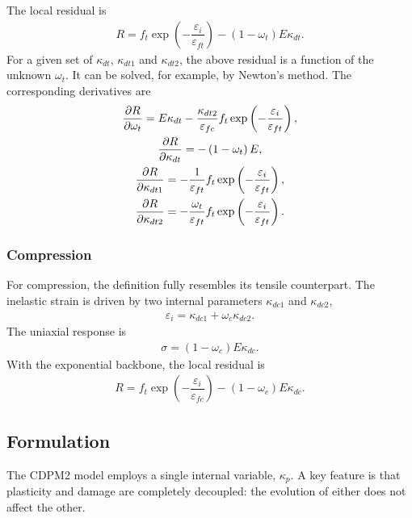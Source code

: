 The local residual is
\begin{gather}\label{eq:cdpm2_dt_r}
R=f_t\exp\left(-\dfrac{\varepsilon_i}{\varepsilon_{ft}}\right)-\left(1-\omega_t\right)E\kappa_{dt}.
\end{gather}
For a given set of $\kappa_{dt}$, $\kappa_{dt1}$ and $\kappa_{dt2}$, the above residual is a function of the unknown $\omega_t$.
It can be solved, for example, by Newton's method.
The corresponding derivatives are
\begin{gather}
\dfrac{\partial{R}}{\partial{\omega_t}}=E\kappa_{dt}-\dfrac{\kappa_{dt2}}{\varepsilon_{fc}}f_t\exp\left(-\dfrac{\varepsilon_i}{\varepsilon_{ft}}\right),\\
\dfrac{\partial{R}}{\partial{\kappa_{dt}}}=-\left(1-\omega_t\right)E,\\
\dfrac{\partial{R}}{\partial{\kappa_{dt1}}}=-\dfrac{1}{\varepsilon_{ft}}f_t\exp\left(-\dfrac{\varepsilon_i}{\varepsilon_{ft}}\right),\\
\dfrac{\partial{R}}{\partial{\kappa_{dt2}}}=-\dfrac{\omega_t}{\varepsilon_{ft}}f_t\exp\left(-\dfrac{\varepsilon_i}{\varepsilon_{ft}}\right).
\end{gather}
\subsubsection{Compression}
For compression, the definition fully resembles its tensile counterpart.
The inelastic strain is driven by two internal parameters $\kappa_{dc1}$ and $\kappa_{dc2}$,
\begin{gather}
\varepsilon_i=\kappa_{dc1}+\omega_c\kappa_{dc2}.
\end{gather}
The uniaxial response is
\begin{gather}
\sigma=\left(1-\omega_c\right)E\kappa_{dc}.
\end{gather}
With the exponential backbone, the local residual is
\begin{gather}\label{eq:cdpm2_dc_r}
R=f_t\exp\left(-\dfrac{\varepsilon_i}{\varepsilon_{fc}}\right)-\left(1-\omega_c\right)E\kappa_{dc}.
\end{gather}
\subsection{Formulation}
The CDPM2 model employs a single internal variable, $\kappa_p$.
A key feature is that plasticity and damage are completely decoupled: the evolution of either does not affect the other.
